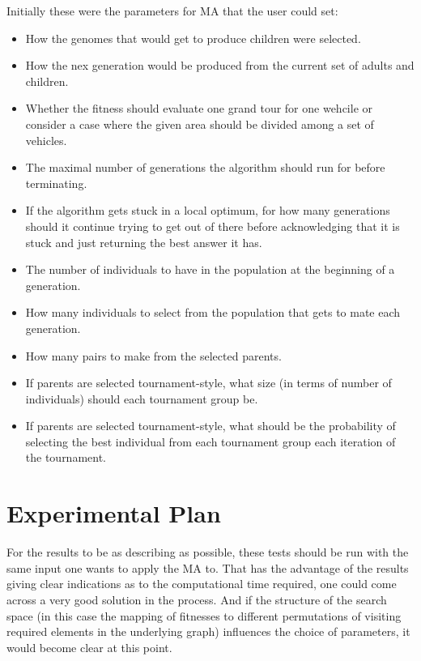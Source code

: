 Initially these were the parameters for MA that the user could set:
\begin{itemize}
	\item How the genomes that would get to produce children were selected.
	\item How the nex generation would be produced from the current set of adults and children.
	\item Whether the fitness should evaluate one grand tour for one wehcile or consider a case where the given area should be divided among a set of vehicles.
	\item The maximal number of generations the algorithm should run for before terminating.
	\item If the algorithm gets stuck in a local optimum, for how many generations should it continue trying to get out of there before acknowledging that it is stuck and just returning the best answer it has.
	\item The number of individuals to have in the population at the beginning of a generation.
	\item How many individuals to select from the population that gets to mate each generation.
	\item How many pairs to make from the selected parents.
	\item If parents are selected tournament-style, what size (in terms of number of individuals) should each tournament group be.
	\item If parents are selected tournament-style, what should be the probability of selecting the best individual from each tournament group each iteration of the tournament.

\end{itemize}

\section{Experimental Plan} %
\label{sec:experimental_plan}
For the results to be as describing as possible, these tests should be run with the same input one wants to apply the MA to. That has the advantage of the results giving clear indications as to the computational time required, one could come across a very good solution in the process. And if the structure of the search space (in this case the mapping of fitnesses to different permutations of visiting required elements in the underlying graph) influences the choice of parameters, it would become clear at this point.

